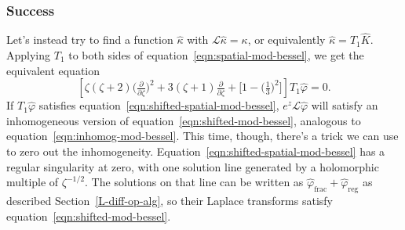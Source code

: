 \documentclass{article}
\theoremstyle{definition}
\theoremstyle{plain}
\newcommand{\laplace}{\mathcal{L}}
\begin{document}
\subsubsection{Success}
Let's instead try to find a function $\hat{\kappa}$ with $\laplace \hat{\kappa} = \kappa$, or equivalently $\hat{\kappa} = T_1 \hat{K}$. Applying $T_1$ to both sides of equation~\ref{eqn:spatial-mod-bessel}, we get the equivalent equation
\begin{equation}\label{eqn:shifted-spatial-mod-bessel}
\left[\zeta(\zeta + 2) \big(\tfrac{\partial}{\partial \zeta}\big)^2 + 3(\zeta + 1) \tfrac{\partial}{\partial \zeta} + \big[1 - \big(\tfrac{1}{3}\big)^2\big]\right] T_1 \hat{\varphi} = 0.
\end{equation}
If $T_1 \hat{\varphi}$ satisfies equation~\ref{eqn:shifted-spatial-mod-bessel}, $e^z \laplace \hat{\varphi}$ will satisfy an inhomogeneous version of equation~\ref{eqn:shifted-mod-bessel}, analogous to equation~\ref{eqn:inhomog-mod-bessel}. This time, though, there's a trick we can use to zero out the inhomogeneity. Equation~\ref{eqn:shifted-spatial-mod-bessel} has a regular singularity at zero, with one solution line generated by a holomorphic multiple of $\zeta^{-1/2}$. The solutions on that line can be written as $\hat{\varphi}_\text{frac} + \hat{\varphi}_\text{reg}$ as described Section~\ref{L-diff-op-alg}, so their Laplace transforms satisfy equation~\ref{eqn:shifted-mod-bessel}.
\end{document}

